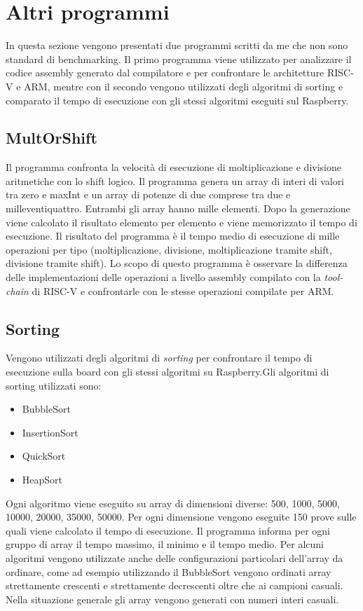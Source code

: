 \documentclass[12pt, a4paper]{report}
\begin{document}

\section{Altri programmi} 

In questa sezione vengono presentati due programmi scritti da me che non sono standard di benchmarking. Il primo programma viene utilizzato per analizzare il codice assembly generato dal compilatore e per confrontare le architetture RISC-V e ARM, mentre con il secondo vengono utilizzati degli algoritmi di sorting e comparato il tempo di esecuzione con gli stessi algoritmi eseguiti sul Raspberry.


\subsection{MultOrShift}
	Il programma confronta la velocità di esecuzione di moltiplicazione e divisione
aritmetiche con lo shift logico. Il programma genera un array di interi di
valori tra zero e maxInt e un array di potenze di due comprese tra due e
milleventiquattro. Entrambi gli array hanno mille elementi. Dopo la generazione
viene calcolato il risultato elemento per elemento e viene memorizzato il
tempo di esecuzione. Il risultato del programma \`e il tempo medio di esecuzione
di mille operazioni per tipo (moltiplicazione, divisione, 
moltiplicazione tramite shift, divisione tramite shift). 
Lo scopo di questo programma è osservare la differenza delle implementazioni delle operazioni a livello assembly compilato con la \textit{tool-chain} di RISC-V e confrontarle con le stesse operazioni compilate per ARM.
		
		
\subsection{Sorting}
Vengono utilizzati degli algoritmi di \textit{sorting} per confrontare il tempo di esecuzione sulla board con gli stessi algoritmi su Raspberry.Gli algoritmi di sorting utilizzati sono:
\begin{itemize}
	\item BubbleSort
	\item InsertionSort
	\item QuickSort
	\item HeapSort
\end{itemize}

Ogni algoritmo viene eseguito su array di dimensioni diverse: 500, 1000, 5000, 10000, 20000, 35000, 50000. Per ogni dimensione vengono eseguite 150 prove sulle quali viene calcolato il tempo di esecuzione. Il programma informa per ogni gruppo di array il tempo massimo, il minimo e il tempo medio. Per alcuni algoritmi vengono utilizzate anche delle configurazioni particolari dell'array da ordinare, come ad esempio utilizzando il BubbleSort vengono ordinati array strettamente crescenti e strettamente decrescenti oltre che ai campioni casuali. Nella situazione generale gli array vengono generati con numeri interi casuali.
\end{document}
